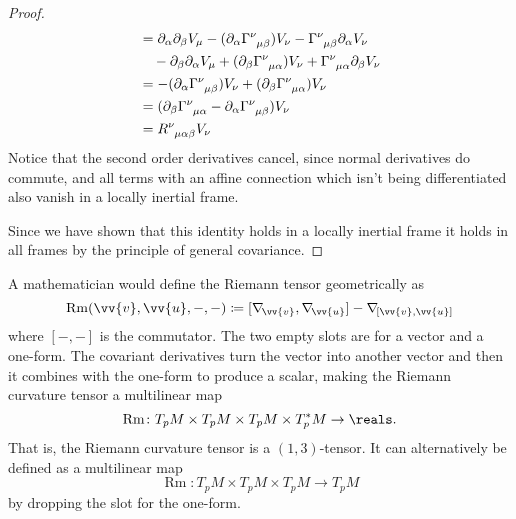 \documentclass[fleqn]{NotesClass}
\newcommand*{\christoffel}[3]{\tensor{\Gamma}{^{#1}_{{#2}{#3}}}}
\newcommand*{\covariantDerivative}[1]{\nabla_{\!#1}}
\begin{document}
\begin{lma}{}{}
\begin{proof}
\begin{align}
                &= \partial_\alpha\partial_\beta V_\mu - (\partial_\alpha\christoffel{\nu}{\mu}{\beta})V_\nu - \christoffel{\nu}{\mu}{\beta}\partial_\alpha V_\nu\notag\\
                &\quad- \partial_\beta\partial_\alpha V_\mu + (\partial_\beta \christoffel{\nu}{\mu}{\alpha})V_\nu + \christoffel{\nu}{\mu}{\alpha} \partial_\beta V_\nu\\
                &= - (\partial_\alpha\christoffel{\nu}{\mu}{\beta})V_\nu + (\partial_\beta \christoffel{\nu}{\mu}{\alpha})V_\nu\\
                &= (\partial_\beta\christoffel{\nu}{\mu}{\alpha} - \partial_\alpha\christoffel{\nu}{\mu}{\beta})V_\nu\\
                &= \tensor{R}{^\nu_{\mu\alpha\beta}}V_\nu
            \end{align}
            Notice that the second order derivatives cancel, since normal derivatives do commute, and all terms with an affine connection which isn't being differentiated also vanish in a locally inertial frame.
            
            Since we have shown that this identity holds in a locally inertial frame it holds in all frames by the principle of general covariance.
        \end{proof}
    \end{lma}
    
    A mathematician would define the Riemann tensor geometrically as
    \begin{equation}
        \mathop{\mathrm{Rm}}(\vv{v}, \vv{u}, -, -) \coloneqq [\covariantDerivative{\vv{v}}, \covariantDerivative{\vv{u}}] - \covariantDerivative{[\vv{v}, \vv{u}]}
    \end{equation}
    where \([-,-]\) is the commutator.
    The two empty slots are for a vector and a one-form.
    The covariant derivatives turn the vector into another vector and then it combines with the one-form to produce a scalar, making the Riemann curvature tensor a multilinear map
    \begin{equation}
        \mathop{\mathrm{Rm}}\colon T_pM \times T_pM \times T_pM \times T^*_pM \to \reals.
    \end{equation}
    That is, the Riemann curvature tensor is a \((1, 3)\)-tensor.
    It can alternatively be defined as a multilinear map
    \begin{equation}
        \mathop{\mathrm{Rm}}\colon T_pM \times T_pM \times T_pM \to T_pM
    \end{equation}
    by dropping the slot for the one-form.
    
\end{document}
